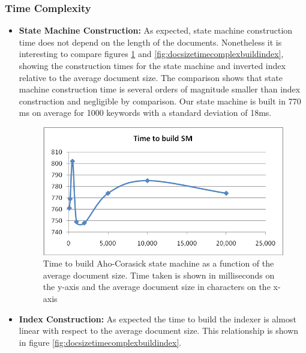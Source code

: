 \documentclass[10pt]{report}
\begin{document}
\subsubsection{Time Complexity}
\begin{itemize}
\item \textbf{State Machine Construction:} 
  As expected, state machine construction time
  does not depend on the length of the documents. Nonetheless it is
  interesting to compare figures \ref{fig:docsizetimecomplexbuildsm}
  and \ref{fig:docsizetimecomplexbuildindex}, showing the construction
  times for the state machine and inverted index relative to the
  average document size. The comparison shows that state machine
  construction time is several orders of magnitude smaller than index
  construction and negligible by comparison. Our state machine is
  built in 770 ms on average for 1000 keywords with a standard
  deviation of 18ms. 

  \begin{figure}[h!]
    \begin{center}
      \includegraphics[width=\textwidth,height=!]{docsizetimecomplexbuildsm}
    \end{center}
    \caption{Time to build Aho-Corasick state machine as a function of
      the average document size. Time taken is shown in milliseconds on the
      y-axis and the average document size in characters on the x-axis}
    \label{fig:docsizetimecomplexbuildsm}
  \end{figure} 

\item \textbf{Index Construction:} 
  As expected the time to build the indexer is almost linear with
  respect to the average document size. This relationship is shown in
  figure \ref{fig:docsizetimecomplexbuildindex}.


\end{itemize}
\end{document}
